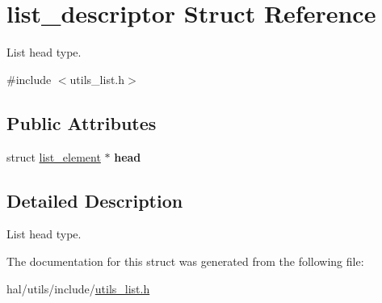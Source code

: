 \hypertarget{structlist__descriptor}{}\section{list\+\_\+descriptor Struct Reference}
\label{structlist__descriptor}


List head type.  




{\ttfamily \#include $<$utils\+\_\+list.\+h$>$}

\subsection*{Public Attributes}
\begin{DoxyCompactItemize}
\item 
\mbox{\label{structlist__descriptor_acc7a3bb5c92dc985a2a7c27c958f1ed8}} 
struct \hyperlink{structlist__element}{list\+\_\+element} $\ast$ {\bfseries head}
\end{DoxyCompactItemize}


\subsection{Detailed Description}
List head type. 

The documentation for this struct was generated from the following file\+:\begin{DoxyCompactItemize}
\item 
hal/utils/include/\hyperlink{utils__list_8h}{utils\+\_\+list.\+h}\end{DoxyCompactItemize}
